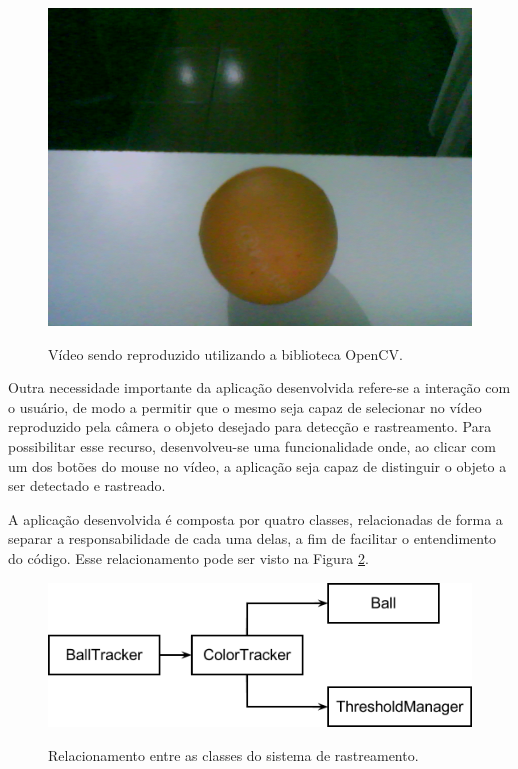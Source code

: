 \begin{figure}[H]
    \centering
    {\includegraphics[scale=0.25]{figuras/cam_opencv}}
    \caption{Vídeo sendo reproduzido utilizando a biblioteca OpenCV.}
    \label{img:cam_opencv}
\end{figure}

Outra necessidade importante da aplicação desenvolvida refere-se a interação com o usuário, de modo a permitir que o mesmo seja capaz de selecionar no vídeo reproduzido pela câmera o objeto desejado para detecção e rastreamento. Para possibilitar esse recurso, desenvolveu-se uma funcionalidade onde, ao clicar com um dos botões do mouse no vídeo, a aplicação seja capaz de distinguir o objeto a ser detectado e rastreado.

A aplicação desenvolvida é composta por quatro classes, relacionadas de forma a separar a responsabilidade de cada uma delas, a fim de facilitar o entendimento do código. Esse relacionamento pode ser visto na Figura \ref{rel_sistema}.

\begin{figure}[H]
    \centering
    {\includegraphics[scale=0.75]{figuras/rel_sistema}}
    \caption{Relacionamento entre as classes do sistema de rastreamento.}
    \label{rel_sistema}
\end{figure}

